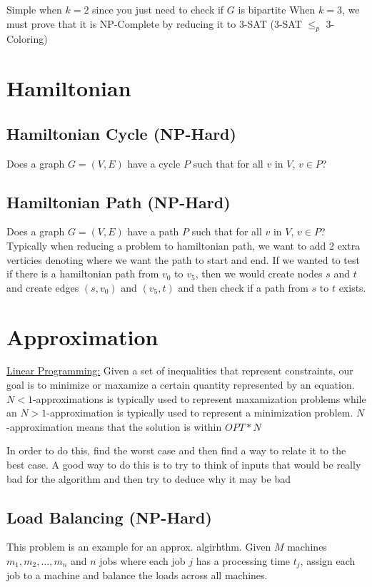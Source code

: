 \documentclass{article}
\begin{document}
Simple when $k=2$ since you just need to check if $G$ is bipartite
When $k=3$, we must prove that it is NP-Complete by reducing it to 3-SAT (3-SAT $\leq_p$ 3-Coloring)

\section{Hamiltonian}
\subsection{Hamiltonian Cycle (NP-Hard)}
Does a graph $G = (V, E)$ have a cycle $P$ such that for all $v$ in $V$, $v \in P$?

\subsection{Hamiltonian Path (NP-Hard)}
Does a graph $G = (V, E)$ have a path $P$ such that for all $v$ in $V$, $v \in P$?
Typically when reducing a problem to hamiltonian path, we want to add 2 extra verticies denoting
where we want the path to start and end. If we wanted to test if there is a hamiltonian path from 
$v_0$ to $v_5$, then we would create nodes $s$ and $t$ and create edges $(s, v_0)$ and $(v_5, t)$
and then check if a path from $s$ to $t$ exists.

\section{Approximation}
\underline{Linear Programming:} Given a set of inequalities that represent constraints, our
goal is to minimize or maxamize a certain quantity represented 
by an equation.
$N<1$-approximations is typically used to represent maxamization problems while
an $N>1$-approximation is typically used to represent a minimization problem. 
$N$-approximation means that the solution is within $OPT*N$

In order to do this, find the worst case and then find a way to relate it to the best case.
A good way to do this is to try to think of inputs that would be really bad for the algorithm
and then try to deduce why it may be bad

\subsection{Load Balancing (NP-Hard)}
This problem is an example for an approx. algirhthm. Given $M$ machines $m_1, m_2, ..., m_n$ and $n$ jobs where each job $j$ has a processing time
$t_j$, assign each job to a machine and balance the loads across all machines.
\end{document}
